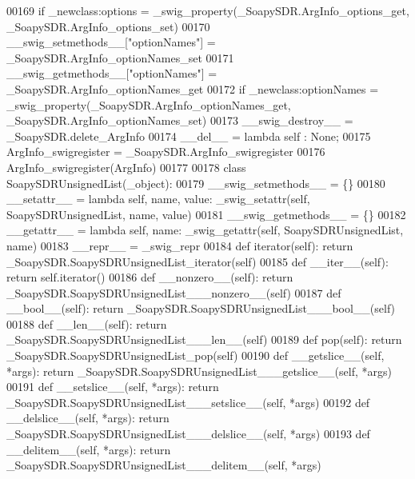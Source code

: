 \begin{DoxyCode}
{{{00169     \textcolor{keywordflow}{if} \_newclass:options = _swig_property(\_SoapySDR.ArgInfo\_options\_get, \_SoapySDR.ArgInfo\_options\_set)
00170     \_\_swig\_setmethods\_\_[\textcolor{stringliteral}{"optionNames"}] = \_SoapySDR.ArgInfo\_optionNames\_set
00171     \_\_swig\_getmethods\_\_[\textcolor{stringliteral}{"optionNames"}] = \_SoapySDR.ArgInfo\_optionNames\_get
00172     \textcolor{keywordflow}{if} \_newclass:optionNames = _swig_property(\_SoapySDR.ArgInfo\_optionNames\_get, 
      \_SoapySDR.ArgInfo\_optionNames\_set)
00173     \_\_swig\_destroy\_\_ = \_SoapySDR.delete\_ArgInfo
00174     \_\_del\_\_ = \textcolor{keyword}{lambda} self : \textcolor{keywordtype}{None};
00175 ArgInfo\_swigregister = \_SoapySDR.ArgInfo\_swigregister
00176 ArgInfo_swigregister(ArgInfo)
00177 
00178 \textcolor{keyword}{class }SoapySDRUnsignedList(_object):
00179     \_\_swig\_setmethods\_\_ = \{\}
00180     \_\_setattr\_\_ = \textcolor{keyword}{lambda} self, name, value: _swig_setattr(self, SoapySDRUnsignedList, name, value)
00181     \_\_swig\_getmethods\_\_ = \{\}
00182     \_\_getattr\_\_ = \textcolor{keyword}{lambda} self, name: _swig_getattr(self, SoapySDRUnsignedList, name)
00183     \_\_repr\_\_ = \_swig\_repr
00184     \textcolor{keyword}{def }iterator(self): \textcolor{keywordflow}{return} \_SoapySDR.SoapySDRUnsignedList\_iterator(self)
00185     \textcolor{keyword}{def }__iter__(self): \textcolor{keywordflow}{return} self.iterator()
00186     \textcolor{keyword}{def }__nonzero__(self): \textcolor{keywordflow}{return} \_SoapySDR.SoapySDRUnsignedList\_\_\_nonzero\_\_(self)
00187     \textcolor{keyword}{def }__bool__(self): \textcolor{keywordflow}{return} \_SoapySDR.SoapySDRUnsignedList\_\_\_bool\_\_(self)
00188     \textcolor{keyword}{def }__len__(self): \textcolor{keywordflow}{return} \_SoapySDR.SoapySDRUnsignedList\_\_\_len\_\_(self)
00189     \textcolor{keyword}{def }pop(self): \textcolor{keywordflow}{return} \_SoapySDR.SoapySDRUnsignedList\_pop(self)
00190     \textcolor{keyword}{def }__getslice__(self, *args): \textcolor{keywordflow}{return} \_SoapySDR.SoapySDRUnsignedList\_\_\_getslice\_\_(self, *args)
00191     \textcolor{keyword}{def }__setslice__(self, *args): \textcolor{keywordflow}{return} \_SoapySDR.SoapySDRUnsignedList\_\_\_setslice\_\_(self, *args)
00192     \textcolor{keyword}{def }__delslice__(self, *args): \textcolor{keywordflow}{return} \_SoapySDR.SoapySDRUnsignedList\_\_\_delslice\_\_(self, *args)
00193     \textcolor{keyword}{def }__delitem__(self, *args): \textcolor{keywordflow}{return} \_SoapySDR.SoapySDRUnsignedList\_\_\_delitem\_\_(self, *args)
}}}
\end{DoxyCode}
